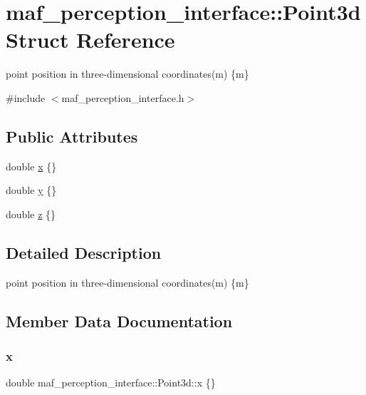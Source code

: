 \hypertarget{structmaf__perception__interface_1_1Point3d}{}\section{maf\+\_\+perception\+\_\+interface\+:\+:Point3d Struct Reference}
\label{structmaf__perception__interface_1_1Point3d}


point position in three-\/dimensional coordinates(m) \{m\}  




{\ttfamily \#include $<$maf\+\_\+perception\+\_\+interface.\+h$>$}

\subsection*{Public Attributes}
\begin{DoxyCompactItemize}
\item 
double \hyperlink{structmaf__perception__interface_1_1Point3d_a10b6257a1cf3b5dbae26926f08e39177}{x} \{\}
\item 
double \hyperlink{structmaf__perception__interface_1_1Point3d_a723c3107a15f191e5b8a102a735ab633}{y} \{\}
\item 
double \hyperlink{structmaf__perception__interface_1_1Point3d_a3e6d05eb0f2dac945466988aeddc7b13}{z} \{\}
\end{DoxyCompactItemize}


\subsection{Detailed Description}
point position in three-\/dimensional coordinates(m) \{m\} 

\subsection{Member Data Documentation}
\mbox{\label{structmaf__perception__interface_1_1Point3d_a10b6257a1cf3b5dbae26926f08e39177}} 
\subsubsection{\texorpdfstring{x}{x}}
{\footnotesize\ttfamily double maf\+\_\+perception\+\_\+interface\+::\+Point3d\+::x \{\}}

